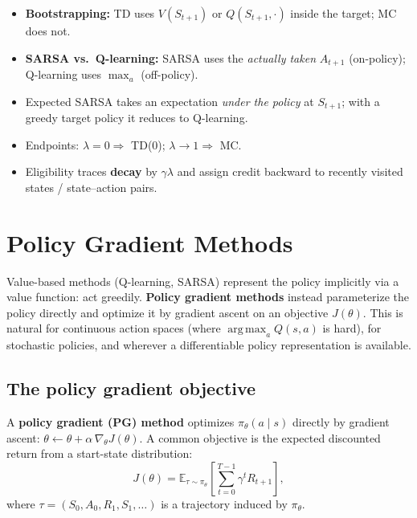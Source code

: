 \documentclass[11pt, oneside]{book}
\newcommand{\E}{\mathbb{E}}
\newcommand{\argmax}{\operatorname*{arg\,max}}
\begin{document}
\begin{notebox}[title={Common Exam Pitfalls — TD}]
\begin{itemize}
  \item \textbf{Bootstrapping:} TD uses $V(S_{t+1})$ or $Q(S_{t+1},\cdot)$
    inside the target; MC does not.
  \item \textbf{SARSA vs.\ Q-learning:} SARSA uses the \emph{actually taken}
    $A_{t+1}$ (on-policy); Q-learning uses $\max_a$ (off-policy).
  \item Expected SARSA takes an expectation \emph{under the policy} at
    $S_{t+1}$; with a greedy target policy it reduces to Q-learning.
  \item Endpoints: $\lambda=0 \Rightarrow$ TD(0); $\lambda \to 1 \Rightarrow$ MC.
  \item Eligibility traces \textbf{decay} by $\gamma\lambda$ and assign
    credit backward to recently visited states / state--action pairs.
\end{itemize}
\end{notebox}


\chapter{Policy Gradient Methods}

Value-based methods (Q-learning, SARSA) represent the policy implicitly
via a value function: act greedily. \textbf{Policy gradient methods}
instead parameterize the policy directly and optimize it by gradient ascent
on an objective $J(\theta)$. This is natural for continuous action spaces
(where $\argmax_a Q(s,a)$ is hard), for stochastic policies, and wherever
a differentiable policy representation is available.

\section{The policy gradient objective}

\begin{defbox}[title={Parameterized Policy and Objective}]
A \textbf{policy gradient (PG) method} optimizes $\pi_\theta(a\mid s)$
directly by gradient ascent:
$\theta \leftarrow \theta + \alpha\,\nabla_\theta J(\theta)$.
A common objective is the expected discounted return from a start-state
distribution:
\[
  J(\theta) = \E_{\tau \sim \pi_\theta}\!\left[\sum_{t=0}^{T-1}\gamma^t R_{t+1}\right],
\]
where $\tau = (S_0, A_0, R_1, S_1, \dots)$ is a trajectory induced by $\pi_\theta$.
\end{defbox}
\end{document}
